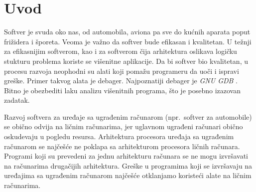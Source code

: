 \documentclass[12pt,oneside]{memoir}
\begin{document}
\frontmatter
\naslovna
\komisija
\apstrakt
\tableofcontents*

\mainmatter

\chapter{Uvod}

Softver je svuda oko nas, od automobila, aviona pa sve do kućnih aparata poput frižidera i šporeta. Veoma je važno da softver bude efikasan i kvalitetan. U težnji za efikasnijim softverom, kao i za softverom čija arhitektura oslikava logičku stukturu problema koriste se višenitne aplikacije. Da bi softver bio kvalitetan, u procesu razvoja neophodni su alati koji pomažu programeru da uoči i ispravi greške. Primer takvog alata je debager. Najpoznatiji debager je \emph{GNU GDB} \cite{GDB}. Bitno je obezbediti laku analizu višenitnih programa, što je posebno izazovan zadatak.

Razvoj softvera za uređaje sa ugrađenim računarom (npr.~softver za automobile) se obično odvija na ličnim računarima, jer uglavnom ugrađeni računari obično oskudevaju u pogledu resursa. Arhitektura procesora uređaja sa ugrađenim računarom se najčešće ne poklapa sa  arhitekturom procesora ličnih računara. Programi koji su prevedeni za jednu arhitekturu računara se ne mogu izvršavati na računarima drugačijih arhitektura. Greške u programima koji se izvršavaju na uređajima sa ugrađenim računarom najčešće otklanjamo koristeći alate na ličnim računarima.
\end{document}
